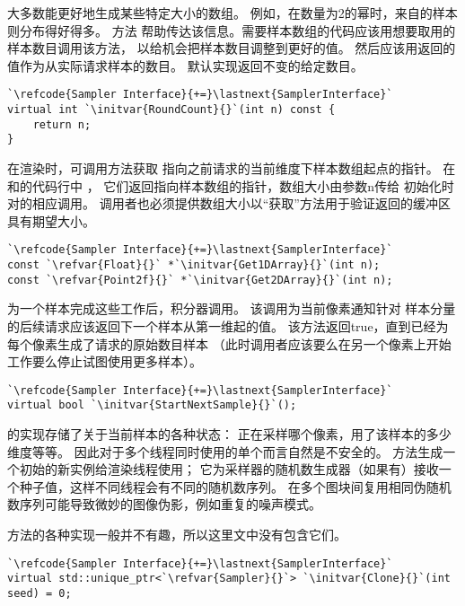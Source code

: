 大多数能更好地生成某些特定大小的数组。
例如，在数量为2的幂时，来自的样本则分布得好得多。
方法
帮助传达该信息。需要样本数组的代码应该用想要取用的样本数目调用该方法，
以给机会把样本数目调整到更好的值。
然后应该用返回的值作为从实际请求样本的数目。
默认实现返回不变的给定数目。
\begin{lstlisting}
`\refcode{Sampler Interface}{+=}\lastnext{SamplerInterface}`
virtual int `\initvar{RoundCount}{}`(int n) const {
    return n;
}
\end{lstlisting}

在渲染时，可调用方法获取
指向之前请求的当前维度下样本数组起点的指针。
在和的代码行中
，
它们返回指向样本数组的指针，数组大小由参数{\ttfamily n}传给
初始化时对的相应调用。
调用者也必须提供数组大小以“获取”方法用于验证返回的缓冲区具有期望大小。
\begin{lstlisting}
`\refcode{Sampler Interface}{+=}\lastnext{SamplerInterface}`  
const `\refvar{Float}{}` *`\initvar{Get1DArray}{}`(int n);
const `\refvar{Point2f}{}` *`\initvar{Get2DArray}{}`(int n);
\end{lstlisting}

为一个样本完成这些工作后，积分器调用。
该调用为当前像素通知针对
样本分量的后续请求应该返回下一个样本从第一维起的值。
该方法返回{\ttfamily true}，直到已经为每个像素生成了请求的原始数目样本
（此时调用者应该要么在另一个像素上开始工作要么停止试图使用更多样本）。
\begin{lstlisting}
`\refcode{Sampler Interface}{+=}\lastnext{SamplerInterface}`
virtual bool `\initvar{StartNextSample}{}`();
\end{lstlisting}

的实现存储了关于当前样本的各种状态：
正在采样哪个像素，用了该样本的多少维度等等。
因此对于多个线程同时使用的单个而言自然是不安全的。
方法生成一个初始的新实例给渲染线程使用；
它为采样器的随机数生成器（如果有）接收一个种子值，这样不同线程会有不同的随机数序列。
在多个图块间复用相同伪随机数序列可能导致微妙的图像伪影，例如重复的噪声模式。

方法的各种实现一般并不有趣，所以这里文中没有包含它们。
\begin{lstlisting}
`\refcode{Sampler Interface}{+=}\lastnext{SamplerInterface}`
virtual std::unique_ptr<`\refvar{Sampler}{}`> `\initvar{Clone}{}`(int seed) = 0;
\end{lstlisting}

